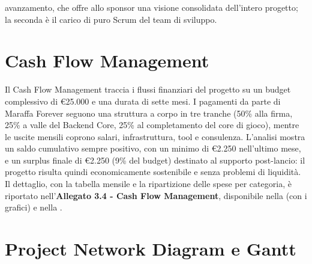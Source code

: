avanzamento, che offre allo sponsor una visione consolidata dell'intero progetto; la seconda è il carico di puro Scrum del team di sviluppo.

\section{Cash Flow Management}

Il Cash Flow Management traccia i flussi finanziari del progetto su un budget complessivo di €25.000 e una durata di sette mesi. I pagamenti da parte di Maraffa Forever seguono una struttura a corpo in tre tranche (50\% alla firma, 25\% a valle del Backend Core, 25\% al completamento del core di gioco), mentre le uscite mensili coprono salari, infrastruttura, tool e consulenza. L'analisi mostra un saldo cumulativo sempre positivo, con un minimo di €2.250 nell'ultimo mese, e un surplus finale di €2.250 (9\% del budget) destinato al supporto post-lancio: il progetto risulta quindi economicamente sostenibile e senza problemi di liquidità. Il dettaglio, con la tabella mensile e la ripartizione delle spese per categoria, è riportato nell'\textbf{Allegato 3.4 - Cash Flow Management}, disponibile nella  (con i grafici) e nella .

\section{Project Network Diagram e Gantt}

